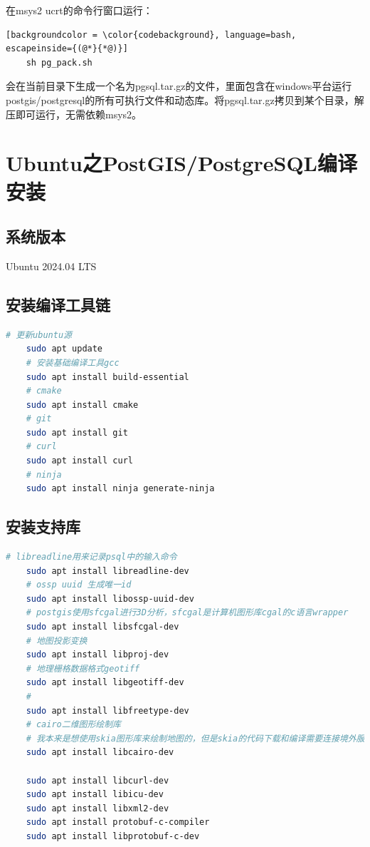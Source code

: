 在msys2 ucrt的命令行窗口运行：
\begin{lstlisting}[backgroundcolor = \color{codebackground}, language=bash, escapeinside={(@*}{*@)}]
	sh pg_pack.sh
\end{lstlisting}

会在当前目录下生成一个名为pgsql.tar.gz的文件，里面包含在windows平台运行postgis/postgresql的所有可执行文件和动态库。将pgsql.tar.gz拷贝到某个目录，解压即可运行，无需依赖msys2。






\chapter{Ubuntu之PostGIS/PostgreSQL编译安装}

\section{系统版本}
Ubuntu 2024.04 LTS

\section{安装编译工具链}
\begin{lstlisting}[backgroundcolor = \color{codebackground}, language=bash]
	# 更新ubuntu源
	sudo apt update
	# 安装基础编译工具gcc
	sudo apt install build-essential 
	# cmake
	sudo apt install cmake 
	# git
	sudo apt install git
	# curl 
	sudo apt install curl 
	# ninja
	sudo apt install ninja generate-ninja
\end{lstlisting}


\section{安装支持库}
\begin{lstlisting}[backgroundcolor = \color{codebackground}, language=bash]
	# libreadline用来记录psql中的输入命令
	sudo apt install libreadline-dev 
	# ossp uuid 生成唯一id
	sudo apt install libossp-uuid-dev
	# postgis使用sfcgal进行3D分析，sfcgal是计算机图形库cgal的c语言wrapper
	sudo apt install libsfcgal-dev
	# 地图投影变换
	sudo apt install libproj-dev
	# 地理栅格数据格式geotiff
	sudo apt install libgeotiff-dev
	# 
	sudo apt install libfreetype-dev
	# cairo二维图形绘制库
	# 我本来是想使用skia图形库来绘制地图的，但是skia的代码下载和编译需要连接境外服务器，而现在的网络环境一言难尽...。所以就只能换成cairo图形库来进行地图的绘制咯。
	sudo apt install libcairo-dev
	
	sudo apt install libcurl-dev
	sudo apt install libicu-dev
	sudo apt install libxml2-dev
	sudo apt install protobuf-c-compiler
	sudo apt install libprotobuf-c-dev

\end{lstlisting}

